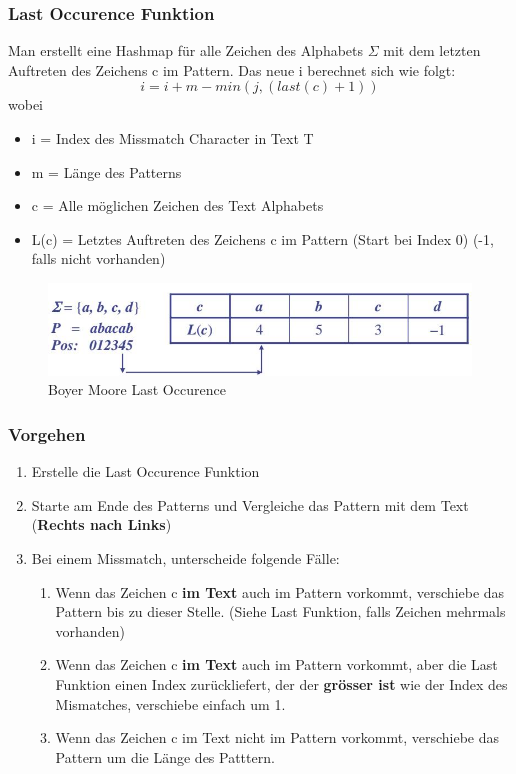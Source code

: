 \subsubsection{Last Occurence Funktion}
Man erstellt eine Hashmap für alle Zeichen des Alphabets $\Sigma$ mit dem letzten Auftreten des Zeichens c im Pattern. Das neue i berechnet sich wie folgt:
\[
	i = i + m - min(j, (last(c) + 1))
\]
wobei
\begin{itemize}[label=]
	\item i = Index des Missmatch Character in Text T
	\item m = Länge des Patterns
	\item c = Alle möglichen Zeichen des Text Alphabets
	\item L(c) = Letztes Auftreten des Zeichens c im Pattern (Start bei Index 0) (-1, falls nicht vorhanden)
\end{itemize}

\begin{figure}[h]
\centering
\includegraphics[width=0.9\linewidth]{images/boyer_moore_last_occurence}
\caption{Boyer Moore Last Occurence}
\label{fig:boyermoorelastoccurence}
\end{figure}

\clearpage

\subsubsection{Vorgehen}
\begin{enumerate}
	\item Erstelle die Last Occurence Funktion
	\item Starte am Ende des Patterns und Vergleiche das Pattern mit dem Text (\textbf{Rechts nach Links})
	\item Bei einem Missmatch, unterscheide folgende Fälle:
	\begin{enumerate}
		\item Wenn das Zeichen c \textbf{im Text} auch im Pattern vorkommt, verschiebe das Pattern bis zu dieser Stelle. (Siehe Last Funktion, falls Zeichen mehrmals vorhanden)
		\item Wenn das Zeichen c \textbf{im Text} auch im Pattern vorkommt, aber die Last Funktion einen Index zurückliefert, der der \textbf{grösser ist} wie der Index des Mismatches, verschiebe einfach um 1.
		\item Wenn das Zeichen c im Text nicht im Pattern vorkommt, verschiebe das Pattern um die Länge des Patttern.
	\end{enumerate}
\end{enumerate}

